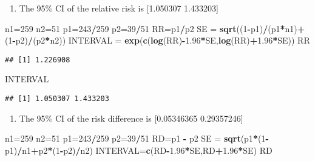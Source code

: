 \documentclass[]{article}
\newenvironment{Shaded}{\begin{snugshade}}{\end{snugshade}}
\newcommand{\KeywordTok}[1]{\textcolor[rgb]{0.13,0.29,0.53}{\textbf{#1}}}
\newcommand{\DecValTok}[1]{\textcolor[rgb]{0.00,0.00,0.81}{#1}}
\newcommand{\FloatTok}[1]{\textcolor[rgb]{0.00,0.00,0.81}{#1}}
\newcommand{\StringTok}[1]{\textcolor[rgb]{0.31,0.60,0.02}{#1}}
\newcommand{\OperatorTok}[1]{\textcolor[rgb]{0.81,0.36,0.00}{\textbf{#1}}}
\newcommand{\NormalTok}[1]{#1}
\providecommand{\tightlist}{%
  \setlength{\itemsep}{0pt}\setlength{\parskip}{0pt}}
\begin{document}
\begin{enumerate}
\def\labelenumi{\alph{enumi}.}
\setcounter{enumi}{1}
\tightlist
\item
  The 95\% CI of the relative risk is {[}1.050307 1.433203{]}
\end{enumerate}

\begin{Shaded}
\begin{Highlighting}[]
\NormalTok{n1=}\DecValTok{259}
\NormalTok{n2=}\DecValTok{51}
\NormalTok{p1=}\DecValTok{243}\OperatorTok{/}\DecValTok{259}
\NormalTok{p2=}\DecValTok{39}\OperatorTok{/}\DecValTok{51}
\NormalTok{RR=p1}\OperatorTok{/}\NormalTok{p2}
\NormalTok{SE =}\StringTok{ }\KeywordTok{sqrt}\NormalTok{((}\DecValTok{1}\OperatorTok{-}\NormalTok{p1)}\OperatorTok{/}\NormalTok{(p1}\OperatorTok{*}\NormalTok{n1)}\OperatorTok{+}\NormalTok{(}\DecValTok{1}\OperatorTok{-}\NormalTok{p2)}\OperatorTok{/}\NormalTok{(p2}\OperatorTok{*}\NormalTok{n2))}
\NormalTok{INTERVAL =}\StringTok{ }\KeywordTok{exp}\NormalTok{(}\KeywordTok{c}\NormalTok{(}\KeywordTok{log}\NormalTok{(RR)}\OperatorTok{-}\FloatTok{1.96}\OperatorTok{*}\NormalTok{SE,}\KeywordTok{log}\NormalTok{(RR)}\OperatorTok{+}\FloatTok{1.96}\OperatorTok{*}\NormalTok{SE))}
\NormalTok{RR}
\end{Highlighting}
\end{Shaded}

\begin{verbatim}
## [1] 1.226908
\end{verbatim}

\begin{Shaded}
\begin{Highlighting}[]
\NormalTok{INTERVAL}
\end{Highlighting}
\end{Shaded}

\begin{verbatim}
## [1] 1.050307 1.433203
\end{verbatim}

\begin{enumerate}
\def\labelenumi{\alph{enumi}.}
\setcounter{enumi}{2}
\tightlist
\item
  The 95\% CI of the risk difference is {[}0.05346365 0.29357246{]}
\end{enumerate}

\begin{Shaded}
\begin{Highlighting}[]
\NormalTok{n1=}\DecValTok{259}
\NormalTok{n2=}\DecValTok{51}
\NormalTok{p1=}\DecValTok{243}\OperatorTok{/}\DecValTok{259}
\NormalTok{p2=}\DecValTok{39}\OperatorTok{/}\DecValTok{51}
\NormalTok{RD=p1 }\OperatorTok{-}\StringTok{ }\NormalTok{p2}
\NormalTok{SE =}\StringTok{ }\KeywordTok{sqrt}\NormalTok{(p1}\OperatorTok{*}\NormalTok{(}\DecValTok{1}\OperatorTok{-}\NormalTok{p1)}\OperatorTok{/}\NormalTok{n1}\OperatorTok{+}\NormalTok{p2}\OperatorTok{*}\NormalTok{(}\DecValTok{1}\OperatorTok{-}\NormalTok{p2)}\OperatorTok{/}\NormalTok{n2)}
\NormalTok{INTERVAL=}\KeywordTok{c}\NormalTok{(RD}\OperatorTok{-}\FloatTok{1.96}\OperatorTok{*}\NormalTok{SE,RD}\OperatorTok{+}\FloatTok{1.96}\OperatorTok{*}\NormalTok{SE)}
\NormalTok{RD}
\end{Highlighting}
\end{Shaded}
\end{document}

